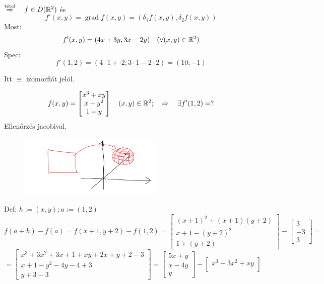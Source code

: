\documentclass[a4paper,11.5pt]{article}
\DeclareMathOperator{\grad}{grad}
\begin{document}
\begin{task}
\begin{task}
\begin{revision}
				$\overset{\text{tétel}}{\Rightarrow}\quad f\in D(\mathbb{R}^2)$ és 
				\[ f'(x,y)=\grad f(x,y)=(\delta_1 f(x,y), \delta_2f(x,y)) \]
				Most:
				\[ f'(x,y)=(4x+3y,3x-2y)\quad (\forall(x,y)\in\mathbb{R}^2) \]
				Spec:
				\[ f'(1,2)=(4\cdot1+\cdot2;3\cdot1-2\cdot2)=(10;-1) \]
			\end{revision}
		\end{task}
		\begin{note}
			Itt $\equiv$ izomorfiát jelöl.
		\end{note}
		
		\begin{task}
			\[ f(x,y)=\begin{bmatrix}
				x^3+xy\\
				x-y^2\\
				1+y
			\end{bmatrix}\quad (x,y)\in\mathbb{R}^2;\quad \Rightarrow\quad \exists f'(1,2)=? \]
			Ellenőrzés jacobival.
			\begin{figure}[H]
				\centering
				\includegraphics[height=3cm]{kepek/05.png}
				\caption{}
			\end{figure}
			Def: $h:=(x,y); a:=(1,2)$
			\[ f(a+h)-f(a)=f(x+1,y+2)-f(1,2)=\begin{bmatrix}
				(x+1)^2+(x+1)(y+2)\\
				x+1-(y+2)^2\\
				1+(y+2)
			\end{bmatrix}-\begin{bmatrix}
				3\\
				-3\\
				3
			\end{bmatrix}=\]
			\[=\begin{bmatrix}
				x^3+3x^2+3x+1+xy+2x+y+2-3\\
				x+1-y^2-4y-4+3\\
				y+3-3
			\end{bmatrix}=\begin{bmatrix}
			5x+y\\
			x-4y\\
			y
			\end{bmatrix}-\begin{bmatrix}
				x^3+3x^2+xy\\

\end{bmatrix}\]
\end{task}
\end{task}
\end{document}
